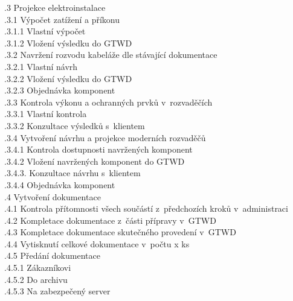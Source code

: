 \documentclass[a4paper, twoside, 11pt]{article}
\begin{document}
			
		\indent {}.3 Projekce elektroinstalace\\
			\indent \indent {}.3.1 Výpočet zatížení a příkonu\\
				\indent \indent \indent {}.3.1.1 Vlastní výpočet\\
				\indent \indent \indent {}.3.1.2 Vložení výsledku do GTWD\\
			\indent \indent {}.3.2 Navržení rozvodu kabeláže dle stávající dokumentace\\
				\indent \indent \indent {}.3.2.1 Vlastní návrh\\
				\indent \indent \indent {}.3.2.2 Vložení výsledku do GTWD\\
				\indent \indent \indent {}.3.2.3 Objednávka komponent\\
			\indent \indent {}.3.3 Kontrola výkonu a ochranných prvků v~rozvaděčích\\
				\indent \indent \indent {}.3.3.1 Vlastní kontrola\\
			\indent \indent \indent {}.3.3.2 Konzultace výsledků s~klientem\\
			\indent \indent {}.3.4 Vytvoření návrhu a projekce moderních rozvaděčů\\
				\indent \indent \indent {}.3.4.1 Kontrola dostupnosti navržených komponent\\
				\indent \indent \indent {}.3.4.2 Vložení navržených komponent do GTWD\\
				\indent \indent \indent {}.3.4.3. Konzultace návrhu s~klientem\\
				\indent \indent \indent {}.3.4.4 Objednávka komponent\\

		\indent \indent {}.4 Vytvoření dokumentace\\
			\indent \indent {}.4.1 Kontrola přítomnosti všech součástí z~předchozích kroků v~administraci\\
			\indent \indent {}.4.2 Kompletace dokumentace z~části přípravy v~GTWD\\
			\indent \indent {}.4.3 Kompletace dokumentace skutečného provedení v~GTWD\\
			\indent \indent {}.4.4 Vytisknutí celkové dokumentace v~počtu x ks\\
			\indent \indent {}.4.5 Předání dokumentace\\
				\indent \indent \indent {}.4.5.1 Zákazníkovi\\
				\indent \indent \indent {}.4.5.2 Do archivu\\
				\indent \indent \indent {}.4.5.3 Na zabezpečený server\\
\end{document}
